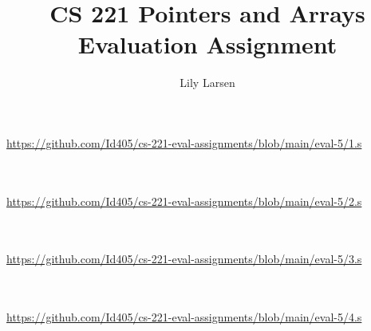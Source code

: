 \documentclass{article}
\title{CS 221 Pointers and Arrays Evaluation Assignment}
\author{Lily Larsen}
\newcommand{\nicecode}[2]{\inputminted[linenos=true,breaklines,fontsize=\small]{#1}{#2}}
\begin{document}
\maketitle
\newpage

\section{}
\vspace{2ex} \par
\url{https://github.com/Id405/cs-221-eval-assignments/blob/main/eval-5/1.s}
\nicecode{asm}{1.s}
\newpage

\section{}
\vspace{2ex} \par
\url{https://github.com/Id405/cs-221-eval-assignments/blob/main/eval-5/2.s}
\nicecode{asm}{2.s}
\newpage

\section{}
\vspace{2ex} \par
\url{https://github.com/Id405/cs-221-eval-assignments/blob/main/eval-5/3.s}
\nicecode{asm}{3.s}
\newpage

\section{}
\vspace{2ex} \par
\url{https://github.com/Id405/cs-221-eval-assignments/blob/main/eval-5/4.s}
\nicecode{asm}{4.s}
\newpage

\newpage
\end{document}
